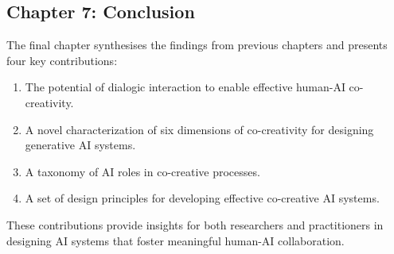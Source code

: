 \subsection*{Chapter 7: Conclusion}

The final chapter synthesises the findings from previous chapters and presents four key contributions:

\begin{enumerate}[label=\arabic*.]
    \item The potential of dialogic interaction to enable effective human-AI co-creativity.
    \item A novel characterization of six dimensions of co-creativity for designing generative AI systems.
    \item A taxonomy of AI roles in co-creative processes.
    \item A set of design principles for developing effective co-creative AI systems.
\end{enumerate}

These contributions provide insights for both researchers and practitioners in designing AI systems that foster meaningful human-AI collaboration.